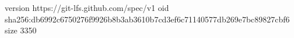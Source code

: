 version https://git-lfs.github.com/spec/v1
oid sha256:db6992c6750276f9926b8b3ab3610b7cd3ef6c71140577db269e7bc89827cbf6
size 3350
